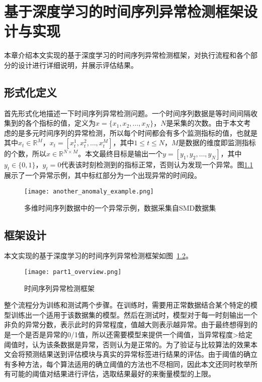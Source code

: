
\chapter{基于深度学习的时间序列异常检测框架设计与实现}
\label{cha:anomaly:detection}
本章介绍本文实现的基于深度学习的时间序列异常检测框架，对执行流程和各个部分的设计进行详细说明，并展示评估结果。
\section{形式化定义}
首先形式化地描述一下时间序列异常检测问题。一个时间序列数据是等时间间隔收集到的各个指标的值，定义为$x=\{x_1,x_2,\dots,x_N\}$，$N$是采集的次数。由于本文考虑的是多元时间序列的异常检测，所以每个时间都会有多个监测指标的值，也就是其中$x_t\in \mathbb{R}^M$，$x_t=[x_t^1,x_t^2,\dots,x_t^M]$，其中$1\leq t\leq N$，$M$是数据的维度即监测指标的个数，所以$x\in \mathbb{R}^{N\times M}$。本文最终目标是输出一个$y=[y_1, y_2,\dots, y_N ]$，其中$y_t\in \{0,1\}$，$y_t=0$代表该时刻检测到的指标正常，否则认为发现一个异常。图\ref{fig:anomaly_example}展示了一个异常示例，其中标红部分为一个出现异常的时间段。
\begin{figure}[htbp]
  \centering
  \texttt{[image: another\_anomaly\_example.png]}
  \caption{多维时间序列数据中的一个异常示例，数据采集自SMD\cite{su2019robust}数据集}
  \label{fig:anomaly_example}
\end{figure}

\section{框架设计}
本文实现的基于深度学习的时间序列异常检测框架如图~\ref{fig:part1_overview}。

\begin{figure}[htbp]
    \centering
    \texttt{[image: part1\_overview.png]}
    \caption{时间序列异常检测框架}
    \label{fig:part1_overview}
  \end{figure}

整个流程分为训练和测试两个步骤。在训练时，需要用正常数据结合某个特定的模型训练出一个适用于该数据集的模型。然后在测试时，模型对于每一时刻输出一个非负的异常分数，表示此时的异常程度，值越大则表示越异常。由于最终想得到的是一个是否是异常的0/1值，所以还需要模型来提供一个阈值，当异常程度>给定阈值时，认为该条数据是异常，否则认为是正常的。为了验证与比较算法的效果本文会将预测结果送到评估模块与真实的异常标签进行结果的评估。由于阈值的确立有多种方法，每个算法适用的确立阈值的方法也不尽相同，因此本文还同时枚举所有可能的阈值对结果进行评估，选取结果最好的来衡量模型的上限\cite{xu2018unsupervised,su2019robust,DBLP:conf/ipccc/LiCP18,DBLP:conf/infocom/ChenXLPCQFW19}。

